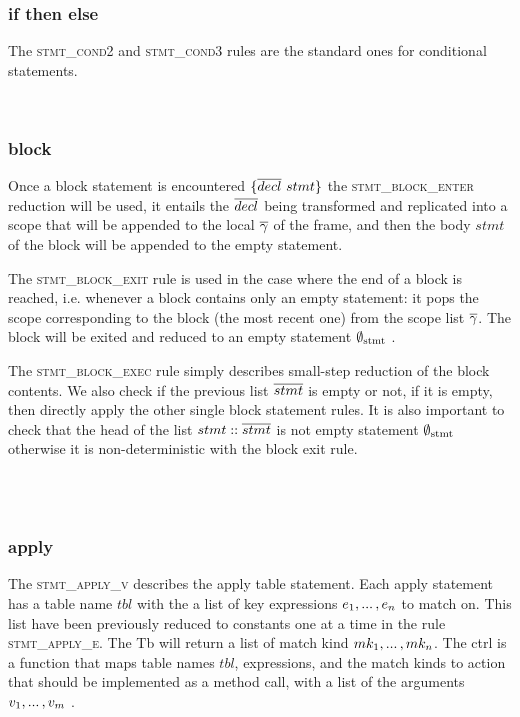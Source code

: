 \documentclass[UTF8]{article}
\begin{document}
\begin{figure}[ht!]
    \ottusedrule{\ottdrulestmtXXassXXv{}}
\end{figure}

\subsubsection*{if then else}
The \textsc{stmt\_cond2} and \textsc{stmt\_cond3} rules are the standard ones for conditional statements.

\begin{figure}[ht!]
    \ottusedrule{\ottdrulestmtXXcondTwo{}} \\
    \ottusedrule{\ottdrulestmtXXcondThree{}} 
\end{figure}


\subsubsection*{block}
Once a block statement is encountered $ \{ \overline{decl} \ stmt \}$ the \textsc{stmt\_block\_enter} reduction will be used, it entails the $\overline{decl}{}$ being transformed and replicated into a scope that will be appended to the local $\overline{\gamma}{}$ of the frame, and then the body $stmt$ of the block will be appended to the empty statement. 


The \textsc{stmt\_block\_exit} rule is used in the case where the end of a block is reached, i.e. whenever a block contains only an empty statement: it pops the scope corresponding to the block (the most recent one) from the scope list $\overline{\gamma}$. The block will be exited and reduced to an empty statement $\emptyset_{ \mathrm{stmt} }{}$ .


The \textsc{stmt\_block\_exec} rule simply describes small-step reduction of the block contents. We also check if the previous list $\overline{stmt}$ is empty or not, if it is empty, then directly apply the other single block statement rules. It is also important to check that the head of the list $stmt::\overline{stmt}$ is not empty statement $\emptyset_{ \mathrm{stmt} }{}$  otherwise it is non-deterministic with the block exit rule. 

\begin{figure}[ht!]
    \ottusedrule{\ottdrulestmtXXblockXXenter{}} \\
    \ottusedrule{\ottdrulestmtXXblockXXexec{}} \\
    \ottusedrule{\ottdrulestmtXXblockXXexit{}} 
\end{figure}


\subsubsection*{apply} 
The \textsc{stmt\_apply\_v} describes the apply table statement. Each apply statement has a table name $tbl$ with the a list of key expressions $e_1 , ... \, , e_n$ to match on. This list have been previously reduced to constants one at a time in the rule \textsc{stmt\_apply\_e}. The Tb will return a list of match kind $mk_1 , ... \, , mk_n$. The ctrl is a function that maps table names $tbl$, expressions, and the match kinds to action that should be implemented as a method call, with a list of the arguments $v_1 , ... \, , v_m $ .
\end{document}

